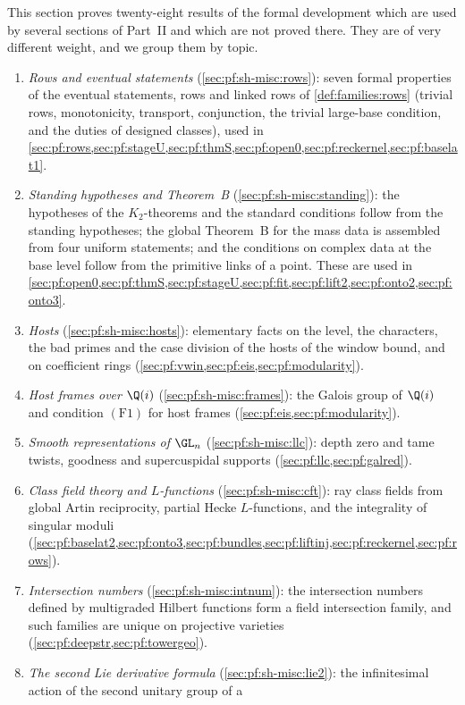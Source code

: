 This section proves twenty-eight results of the formal development which are used by several sections of Part~II and which
are not proved there. They are of very different weight, and we group them by topic.
\begin{enumerate}[label=(\arabic*)]
\item \emph{Rows and eventual statements} (\cref{sec:pf:sh-misc:rows}): seven formal properties of the eventual statements, rows and
linked rows of \cref{def:families:rows} (trivial rows, monotonicity, transport, conjunction, the trivial large-base condition, and the
duties of designed classes), used in \cref{sec:pf:rows,sec:pf:stageU,sec:pf:thmS,sec:pf:open0,sec:pf:reckernel,sec:pf:baselat1}.
\item \emph{Standing hypotheses and Theorem~B} (\cref{sec:pf:sh-misc:standing}): the hypotheses of the $K_2$-theorems and the standard
conditions follow from the standing hypotheses; the global Theorem~B for the mass data is assembled from four uniform statements; and the
conditions on complex data at the base level follow from the primitive links of a point. These are used in
\cref{sec:pf:open0,sec:pf:thmS,sec:pf:stageU,sec:pf:fit,sec:pf:lift2,sec:pf:onto2,sec:pf:onto3}.
\item \emph{Hosts} (\cref{sec:pf:sh-misc:hosts}): elementary facts on the level, the characters, the bad primes and the case division
of the hosts of the window bound, and on coefficient rings (\cref{sec:pf:vwin,sec:pf:eis,sec:pf:modularity}).
\item \emph{Host frames over $\Q(i)$} (\cref{sec:pf:sh-misc:frames}): the Galois group of $\Q(i)$ and condition $(\mathrm{F1})$ for host
frames (\cref{sec:pf:eis,sec:pf:modularity}).
\item \emph{Smooth representations of $\GL_n$} (\cref{sec:pf:sh-misc:llc}): depth zero and tame twists, goodness and supercuspidal
supports (\cref{sec:pf:llc,sec:pf:galred}).
\item \emph{Class field theory and $L$-functions} (\cref{sec:pf:sh-misc:cft}): ray class fields from global Artin reciprocity, partial
Hecke $L$-functions, and the integrality of singular moduli
(\cref{sec:pf:baselat2,sec:pf:onto3,sec:pf:bundles,sec:pf:liftinj,sec:pf:reckernel,sec:pf:rows}).
\item \emph{Intersection numbers} (\cref{sec:pf:sh-misc:intnum}): the intersection numbers defined by multigraded Hilbert functions form a
field intersection family, and such families are unique on projective varieties (\cref{sec:pf:deepstr,sec:pf:towergeo}).
\item \emph{The second Lie derivative formula} (\cref{sec:pf:sh-misc:lie2}): the infinitesimal action of the second unitary group of a

\end{enumerate}
